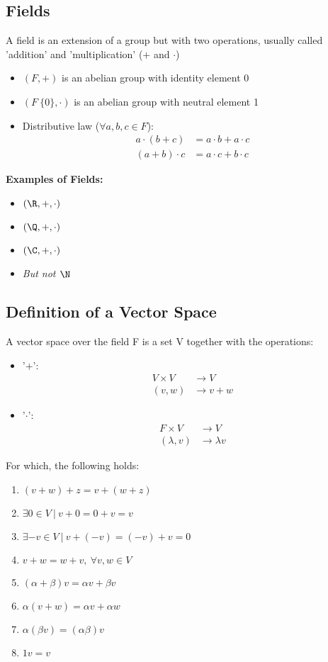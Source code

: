 \documentclass[cplx.tex]{subfiles}
\begin{document}
\subsection{Fields}
A field is an extension of a group but with two operations, usually called 'addition' and 'multiplication' ($+$ and $\cdot$)
\begin{itemize}
    \item $(F,+)$ is an abelian group with identity element 0 
    \item $(F\ \{0\},\cdot)$ is an abelian group with neutral element 1 
    \item Distributive law ($\forall a,b,c \in F$):
        \begin{align}
            a\cdot(b+c) &= a\cdot b + a\cdot c \\
            (a+b)\cdot c &= a\cdot c + b\cdot c
        \end{align}
\end{itemize}

\textbf{Examples of Fields:}
\begin{itemize}
    \item $(\R,+,\cdot)$
    \item $(\Q,+,\cdot)$
    \item $(\C,+,\cdot)$
    \item \emph{But not $\N$}
\end{itemize}

\subsection{Definition of a Vector Space}
A vector space over the field F is a set V together with the operations:
\begin{itemize}
    \item '$+$':
        \begin{align}
            V\times V&\to V \\
            (v,w) &\to v+w 
        \end{align}
    \item '$\cdot$':
        \begin{align}
            F\times V &\to V \\
            (\lambda,v) &\to \lambda v
        \end{align}
\end{itemize}

For which, the following holds:
\begin{enumerate}
    \item $(v+w)+z = v+(w+z)$ 
    \item $\exists 0 \in V ~|~ v+0 = 0+v = v$
    \item $\exists -v \in V ~|~ v + (-v) = (-v)+v = 0$
    \item $v+w=w+v,~\forall v,w \in V$
    \item $(\alpha+\beta)v = \alpha v + \beta v$
    \item $\alpha(v+w) = \alpha v + \alpha w$
    \item $\alpha(\beta v) = (\alpha\beta)v$
    \item $1v = v$
\end{enumerate}
\end{document}
